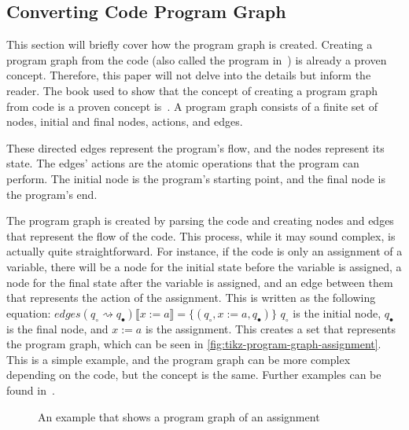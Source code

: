 \subsection{Converting Code Program Graph}\label{subsection:converting-code-program-graph}
This section will briefly cover how the program graph is created.
Creating a program graph from the code (also called the program in~\cite{nielson_formal_2019}) is already a proven concept. Therefore, this paper will not delve into the details but inform the reader.
The book used to show that the concept of creating a program graph from code is a proven concept is~\cite[see][chap 2.2]{nielson_formal_2019}.
A program graph consists of a finite set of nodes, initial and final nodes, actions, and edges.

These directed edges represent the program's flow, and the nodes represent its state. The edges' actions are the atomic operations that the program can perform. The initial node is the program's starting point, and the final node is the program's end.

The program graph is created by parsing the code and creating nodes and edges that represent the flow of the code. This process, while it may sound complex, is actually quite straightforward. For instance, if the code is only an assignment of a variable, there will be a node for the initial state before the variable is assigned, a node for the final state after the variable is assigned, and an edge between them that represents the action of the assignment. This is written as the following equation:
$edges(q_{\circ} \rightsquigarrow q_{\bullet})\llbracket x:=a \rrbracket = \{(q_{\circ}, x:=a, q_{\bullet})\}$
$q_{\circ}$ is the initial node, $q_{\bullet}$ is the final node, and $x:=a$ is the assignment. This creates a set that represents the program graph, which can be seen in \autoref{fig:tikz-program-graph-assignment}. This is a simple example, and the program graph can be more complex depending on the code, but the concept is the same.
Further examples can be found in~\cite[Figure 2.6]{nielson_formal_2019}.

\begin{figure}[htb!]
    \center
    
    \caption{An example that shows a program graph of an assignment}
    \label{fig:tikz-program-graph-assignment}
\end{figure}    